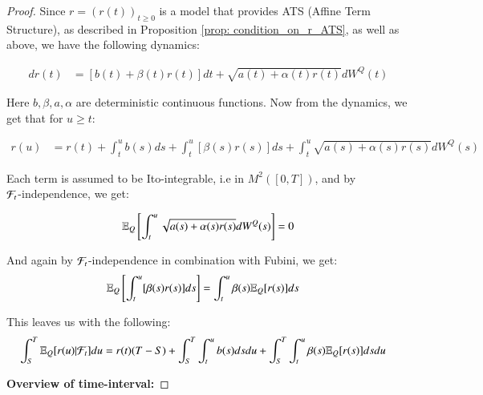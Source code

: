 \begin{proof}

Since $r = (r(t))_{t\geq 0}$ is a model that provides ATS (Affine Term Structure), as described in Proposition \ref{prop: condition_on_r_ATS}, as well as above, we have the following dynamics:

\begin{align*}
dr(t) &= [b(t) + \beta(t)r(t)]dt + \sqrt{a(t) + \alpha(t)r(t)}dW^{Q}(t)
\end{align*}

Here $b, \beta, a, \alpha$ are deterministic continuous functions. Now from the dynamics, we get that for $u\geq t$: 

\begin{align}
\label{eq: r(u)_given_r(t)}
r(u) &= r(t) + \int_{t}^{u}b(s)ds + \int_{t}^{u}[\beta(s)r(s)]ds
+\int_{t}^{u}\sqrt{a(s) + \alpha(s)r(s)}dW^{Q}(s)
\end{align}

Each term is assumed to be Ito-integrable, i.e in $M^{2}([0,T])$, and by \\ $\mathcal{F}_{t}$-independence, we get:

\begin{align*}
\mathbb{E}_{Q}\left[
\int_{t}^{u}\sqrt{a(s) + \alpha(s)r(s)}dW^{Q}(s)
\right] = 0 
\end{align*}

And again by $\mathcal{F}_{t}$-independence in combination with Fubini, we get:
\begin{align*}
\mathbb{E}_{Q}\left[
\int_{t}^{u}[\beta(s)r(s)]ds
\right]
&= 
\int_{t}^{u}\beta(s)\mathbb{E}_{Q}[r(s)]ds
\end{align*}

This leaves us with the following: 
\begin{align}
\label{eq: integral_cond_exp_r(u)}
\int_{S}^{T}\mathbb{E}_{Q}[r(u)|\mathcal{F}_{t}]du 
&= r(t)(T-S)
+ \int_{S}^{T}\int_{t}^{u}b(s)dsdu 
+ \int_{S}^{T}\int_{t}^{u}\beta(s)\mathbb{E}_{Q}[r(s)]dsdu
\end{align}


\textbf{Overview of time-interval:}


\end{proof}
